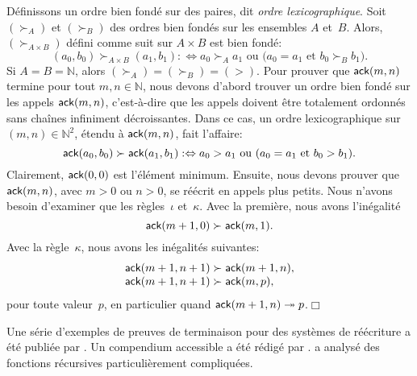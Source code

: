 Définissons un ordre bien fondé sur des paires, dit \emph{ordre
  lexicographique}. Soit
\((\succ_A)\) et \((\succ_B)\) des ordres bien fondés sur les
ensembles \(A\) et~\(B\). Alors, \((\succ_{A \times B})\) défini
comme suit sur \(A \times B\) est bien fondé:
\begin{equation}
(a_0,b_0) \succ_{A \times B} (a_1,b_1) :\Leftrightarrow \text{\(a_0
    \succ_A a_1\) ou (\(a_0 = a_1\) et \(b_0 \succ_B b_1\)).}
\label{def:lexico}
\end{equation}
Si \(A=B=\mathbb{N}\), alors \((\succ_A) = (\succ_B) = (>)\). Pour
prouver que \(\textsf{ack}(m,n)\) termine pour tout \(m,n \in
\mathbb{N}\), nous devons d'abord trouver un ordre bien fondé sur les
appels \(\textsf{ack}(m,n)\), c'est-à-dire que les appels doivent être
totalement ordonnés sans chaînes infiniment décroissantes. Dans ce
cas, un ordre lexicographique sur \((m,n) \in \mathbb{N}^2\), étendu à
\(\textsf{ack}(m,n)\), fait l'affaire:
\begin{equation*}
\textsf{ack}(a_0,b_0) \succ \textsf{ack}(a_1,b_1) :\Leftrightarrow
\text{\(a_0 > a_1\) ou (\(a_0 = a_1\) et \(b_0 > b_1\)).}
\end{equation*}
Clairement, \(\textsf{ack}(0,0)\) est l'élément minimum. Ensuite, nous
devons prouver que \(\textsf{ack}(m,n)\), avec \(m > 0\) ou \(n > 0\), se
réécrit en appels plus petits. Nous n'avons besoin d'examiner que les
règles~\(\iota\) et~\(\kappa\). Avec la première, nous avons
l'inégalité
\begin{equation*}
  \textsf{ack}(m+1,0) \succ \textsf{ack}(m,1).
\end{equation*}
Avec la règle~\(\kappa\), nous avons les inégalités suivantes:
\begin{equation*}
  \begin{array}{@{}r@{\;}l@{\;}l@{}}
    \fun{ack}(m+1,n+1) & \succ & \fun{ack}(m+1,n),\\
    \fun{ack}(m+1,n+1) & \succ & \fun{ack}(m,p),
  \end{array}
\end{equation*}
pour toute valeur~\(p\), en particulier quand \(\textsf{ack}(m+1,n)
\twoheadrightarrow p\).\hfill\(\Box\)

Une série d'exemples de preuves de
terminaison pour des systèmes de réécriture a été
publiée par \cite{Dershowitz_1995,ArtsGiesl_2001}. Un compendium
accessible a été rédigé par \cite{Dershowitz_1987}. \cite{Knuth_2000a}
a analysé des fonctions récursives particulièrement compliquées.


